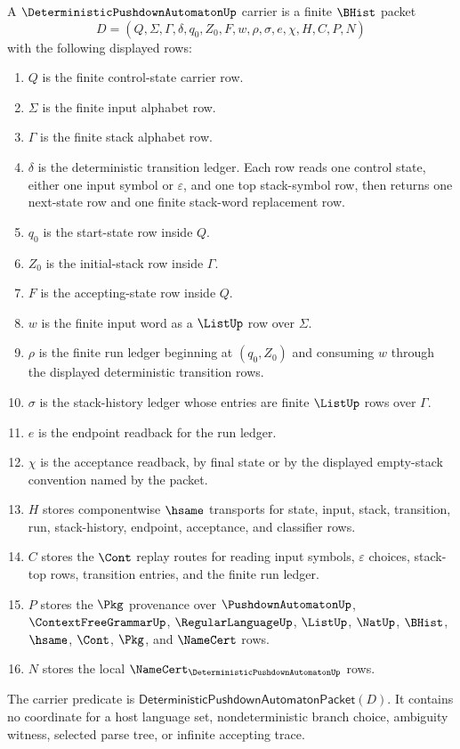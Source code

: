 \begin{definition}
\label{def:deterministic-pushdown-automaton-carrier}
A $\DeterministicPushdownAutomatonUp$ carrier is a finite $\BHist$ packet
$$
D=(Q,\Sigma,\Gamma,\delta,q_0,Z_0,F,w,\rho,\sigma,e,\chi,H,C,P,N)
$$
with the following displayed rows:
\begin{enumerate}
\item $Q$ is the finite control-state carrier row.
\item $\Sigma$ is the finite input alphabet row.
\item $\Gamma$ is the finite stack alphabet row.
\item $\delta$ is the deterministic transition ledger. Each row reads one
control state, either one input symbol or $\varepsilon$, and one top
stack-symbol row, then returns one next-state row and one finite stack-word
replacement row.
\item $q_0$ is the start-state row inside $Q$.
\item $Z_0$ is the initial-stack row inside $\Gamma$.
\item $F$ is the accepting-state row inside $Q$.
\item $w$ is the finite input word as a $\ListUp$ row over $\Sigma$.
\item $\rho$ is the finite run ledger beginning at $(q_0,Z_0)$ and consuming
$w$ through the displayed deterministic transition rows.
\item $\sigma$ is the stack-history ledger whose entries are finite
$\ListUp$ rows over $\Gamma$.
\item $e$ is the endpoint readback for the run ledger.
\item $\chi$ is the acceptance readback, by final state or by the displayed
empty-stack convention named by the packet.
\item $H$ stores componentwise $\hsame$ transports for state, input, stack,
transition, run, stack-history, endpoint, acceptance, and classifier rows.
\item $C$ stores the $\Cont$ replay routes for reading input symbols,
$\varepsilon$ choices, stack-top rows, transition entries, and the finite run
ledger.
\item $P$ stores the $\Pkg$ provenance over $\PushdownAutomatonUp$,
$\ContextFreeGrammarUp$, $\RegularLanguageUp$, $\ListUp$, $\NatUp$, $\BHist$,
$\hsame$, $\Cont$, $\Pkg$, and $\NameCert$ rows.
\item $N$ stores the local $\NameCert_{\DeterministicPushdownAutomatonUp}$
rows.
\end{enumerate}
The carrier predicate is
$\mathsf{DeterministicPushdownAutomatonPacket}(D)$. It contains no coordinate
for a host language set, nondeterministic branch choice, ambiguity witness,
selected parse tree, or infinite accepting trace.
\end{definition}

